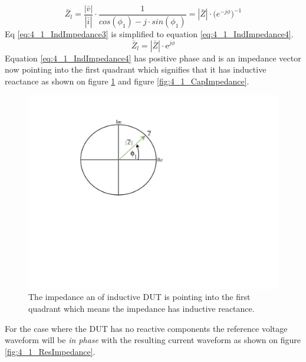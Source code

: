 \begin{equation}\label{eq:4_1_IndImpedance3} 
    \bar Z_l = \frac{|\bar v|}{|\bar i|} \cdot \frac{1}{cos(\phi_1) - j\cdot sin(\phi_1)} = |\bar Z| \cdot \mathrm (e^{-j\phi})^{-1}
\end{equation}
Eq \ref{eq:4_1_IndImpedance3} is simplified to equation \ref{eq:4_1_IndImpedance4}.
\begin{equation}\label{eq:4_1_IndImpedance4} 
    \bar Z_l =|\bar Z| \cdot \mathrm e^{j\phi}
\end{equation}
Equation \ref{eq:4_1_IndImpedance4} has positive phase and is an impedance vector now pointing into the first quadrant which signifies that it has inductive reactance as shown on figure \ref{fig:4_1_IndImpedance} and figure \ref{fig:4_1_CapImpedance}.

\begin{figure}[H]
    \centering
    \includegraphics[clip, trim=0 275 0 0, width=1\textwidth]{Sections/4_TechnicalAnalysis/Figures/4_1_IndImpedance.pdf}
    \caption{The impedance an of inductive DUT is pointing into the first quadrant which means the impedance has inductive reactance.}
    \label{fig:4_1_IndImpedance}
\end{figure}

For the case where the DUT has no reactive components the reference voltage waveform will be \textit{in phase} with the resulting current waveform as shown on figure \ref{fig:4_1_ResImpedance}.

